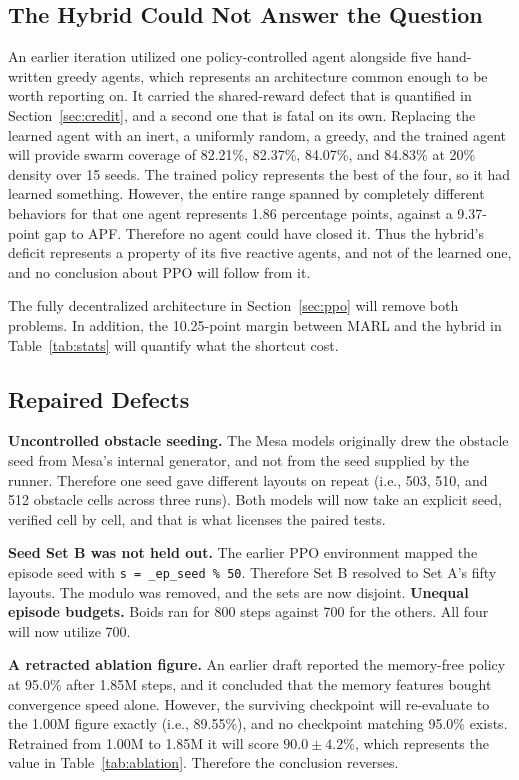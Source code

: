 \documentclass[a4paper, 10pt, conference]{ieeeconf}
\begin{document}
\subsection{The Hybrid Could Not Answer the Question}
\label{sec:hybrid_ablation}

An earlier iteration utilized one policy-controlled agent alongside
five hand-written greedy agents, which represents an architecture
common enough to be worth reporting on. It carried the shared-reward
defect that is quantified in Section~\ref{sec:credit}, and a second
one that is fatal on its own. Replacing the learned agent with an
inert, a uniformly random, a greedy, and the trained agent will
provide swarm coverage of 82.21\%, 82.37\%, 84.07\%, and 84.83\% at
20\% density over 15 seeds. The trained policy represents the best of
the four, so it had learned something. However, the entire range
spanned by completely different behaviors for that one agent
represents 1.86 percentage points, against a 9.37-point gap to APF.
Therefore no agent could have closed it. Thus the hybrid's deficit
represents a property of its five reactive agents, and not of the
learned one, and no conclusion about PPO will follow from it.

The fully decentralized architecture in Section~\ref{sec:ppo} will
remove both problems. In addition, the 10.25-point margin between MARL
and the hybrid in Table~\ref{tab:stats} will quantify what the
shortcut cost.

\subsection{Repaired Defects}

\textbf{Uncontrolled obstacle seeding.} The Mesa models originally
drew the obstacle seed from Mesa's internal generator, and not from
the seed supplied by the runner. Therefore one seed gave different
layouts on repeat (i.e., 503, 510, and 512 obstacle cells across three
runs). Both models will now take an explicit seed, verified cell by
cell, and that is what licenses the paired tests.

\textbf{Seed Set B was not held out.} The earlier PPO environment
mapped the episode seed with \texttt{s = \_ep\_seed \% 50}. Therefore
Set B resolved to Set A's fifty layouts. The modulo was removed, and
the sets are now disjoint. \textbf{Unequal episode budgets.} Boids ran
for 800 steps against 700 for the others. All four will now utilize
700.

\textbf{A retracted ablation figure.} An earlier draft reported the
memory-free policy at 95.0\% after 1.85M steps, and it concluded that
the memory features bought convergence speed alone. However, the
surviving checkpoint will re-evaluate to the 1.00M figure exactly
(i.e., 89.55\%), and no checkpoint matching 95.0\% exists. Retrained
from 1.00M to 1.85M it will score $90.0\pm4.2\%$, which represents the
value in Table~\ref{tab:ablation}. Therefore the conclusion reverses.
\end{document}
